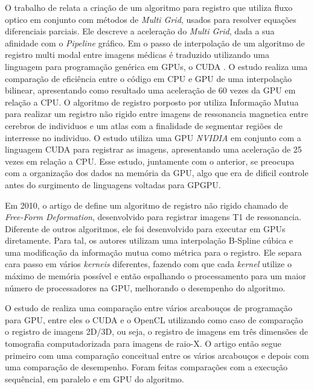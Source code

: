 	O trabalho de \cite{grossauer2008gpu} relata a criação de um algoritmo para registro que utiliza fluxo optico em 
conjunto com métodos de \textit{Multi Grid}, usados para resolver equações diferenciais parciais. Ele descreve
a aceleração do \textit{Multi Grid}, dada a sua afinidade com o \textit{Pipeline} gráfico. Em \cite{bui2009performance}
o passo de interpolação de um algoritmo de registro multi modal entre imagens médicas é traduzido utilizando uma 
linguagem para programação genérica em GPUs, o CUDA \cite{nvidia2007compute}. O estudo realiza uma comparação de 
eficiência entre o código em CPU e GPU de uma interpolação bilinear, apresentando como resultado uma aceleração de 60 
vezes da GPU em relação a CPU. O algoritmo de registro porposto por \cite{han2009gpu} utiliza Informação Mutua para
realizar um registro não rigido entre imagens de ressonancia magnetica entre cerebros de individuos e um atlas com a 
finalidade de segmentar regiões de interresse no individuo. O estudo utiliza uma GPU \textit{NVIDIA} em conjunto com a 
linguagem CUDA para registrar as imagens, apresentando uma aceleração de 25 vezes em relação a CPU. Esse estudo, 
juntamente com o anterior, se preocupa com a organização dos dados na memória da GPU, algo que era de dificil controle 
antes do surgimento de linguagens voltadas para GPGPU.

	Em 2010, o artigo de \cite{modat2010fast} define um algoritmo de registro não rigido chamado de \textit{Free-Form 
Deformation}, desenvolvido para registrar imagens T1 de ressonancia. Diferente de outros algoritmos, ele foi desenvolvido
para executar em GPUs diretamente. Para tal, os autores utilizam uma interpolação B-Spline cúbica e uma modificação da
informação mutua como métrica para o registro. Ele separa cara passo em vários \textit{kerneis} diferentes, fazendo
com que cada \textit{kernel} utilize o máximo de memória possível e então espalhando o processamento para um maior número
de processadores na GPU, melhorando o desempenho do algoritmo. 

	O estudo de \cite{membarth2011frameworks} realiza uma comparação entre vários arcabouços de programação para GPU,
entre eles o CUDA e o OpenCL utilizando como caso de comparação o registro de imagens 2D/3D, ou seja, o registro de
imagens em três dimensões de tomografia computadorizada para imagens de raio-X. O artigo então segue primeiro com uma
comparação conceitual entre os vários arcabouços e depois com uma comparação de desempenho. Foram feitas comparações 
com a execução sequêncial, em paralelo e em GPU do algoritmo. 
	
